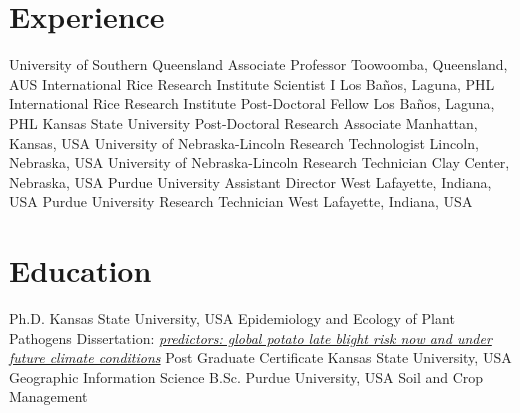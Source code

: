 \section*{Experience}
\begin{entrylist}
    {University of Southern Queensland}
    {Associate Professor}
    {Toowoomba, Queensland, AUS}
    {International Rice Research Institute}
    {Scientist I}
    {Los Ba\~nos, Laguna, PHL}
    {International Rice Research Institute}
    {Post-Doctoral Fellow}
    {Los Ba\~nos, Laguna, PHL}
    {Kansas State University}
    {Post-Doctoral Research Associate}
    {Manhattan, Kansas, USA}
   {University of Nebraska-Lincoln}
   {Research Technologist}
   {Lincoln, Nebraska, USA}
   {University of Nebraska-Lincoln}
   {Research Technician}
   {Clay Center, Nebraska, USA}
   {Purdue University}
   {Assistant Director}
   {West Lafayette, Indiana, USA}
   {Purdue University}
   {Research Technician}
   {West Lafayette, Indiana, USA}
\end{entrylist}

\section*{Education}
\begin{entrylist}
    {Ph.D. {}}
    {Kansas State University, USA}
    {Epidemiology and Ecology of Plant Pathogens}
  \entry{}
  {Dissertation: }
  {}
    {\emph{\href{https://krex.k-state.edu/dspace/handle/2097/2341?show=full}{predictors: global potato late blight risk now and under future climate conditions}}}
    {Post Graduate Certificate {}}
    {Kansas State University, USA}
    {Geographic Information Science}
    {B.Sc. {}}
    {Purdue University, USA}
    {Soil and Crop Management}
\end{entrylist}
